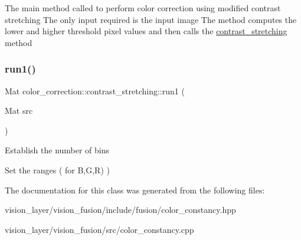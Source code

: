 The main method called to perform color correction using modified contrast stretching The only input required is the input image The method computes the lower and higher threshold pixel values and then calls the \hyperlink{classcolor__correction_1_1contrast__stretching}{contrast\+\_\+stretching} method \mbox{\label{classcolor__correction_1_1contrast__stretching_a059efe3142744d161a0022ffeff5b79c}} 
\subsubsection{\texorpdfstring{run1()}{run1()}}
{\footnotesize\ttfamily Mat color\+\_\+correction\+::contrast\+\_\+stretching\+::run1 (\begin{DoxyParamCaption}\item[{Mat}]{src }\end{DoxyParamCaption})}

Establish the number of bins

Set the ranges ( for B,G,R) ) 

The documentation for this class was generated from the following files\+:\begin{DoxyCompactItemize}
\item 
vision\+\_\+layer/vision\+\_\+fusion/include/fusion/color\+\_\+constancy.\+hpp\item 
vision\+\_\+layer/vision\+\_\+fusion/src/color\+\_\+constancy.\+cpp\end{DoxyCompactItemize}
